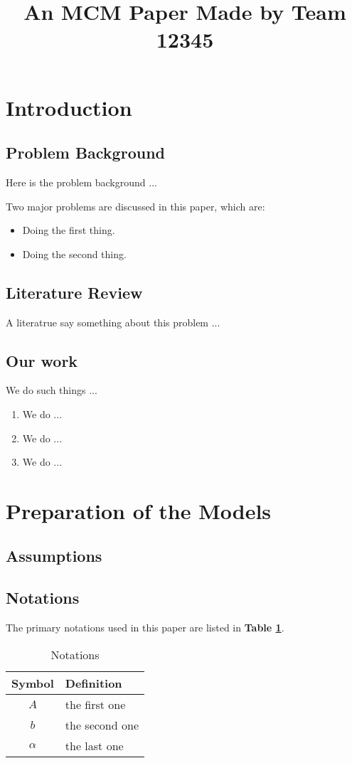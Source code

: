 \documentclass[12pt]{article}
\title{An MCM Paper Made by Team 12345}  %
\begin{document}

\section{Introduction}
\subsection{Problem Background}
Here is the problem background ...

Two major problems are discussed in this paper, which are:
\begin{itemize}
    \item Doing the first thing.
    \item Doing the second thing.
\end{itemize}

\subsection{Literature Review}
A literatrue\cite{1} say something about this problem ...

\subsection{Our work}
We do such things ...

\begin{enumerate}[\bfseries 1.]
    \item We do ...
    \item We do ...
    \item We do ...
\end{enumerate}

\section{Preparation of the Models}
\subsection{Assumptions}

\subsection{Notations}
The primary notations used in this paper are listed in \textbf{Table \ref{tb:notation}}.
\begin{table}[!htbp]
\begin{center}
\caption{Notations}
\begin{tabular}{cl}
	\toprule
	\multicolumn{1}{m{3cm}}{\centering Symbol}
	&\multicolumn{1}{m{8cm}}{\centering Definition}\\
	\midrule
	$A$&the first one\\
	$b$&the second one\\
	$\alpha$ &the last one\\
	\bottomrule
\end{tabular}\label{tb:notation}
\end{center}
\end{table}
\end{document}
